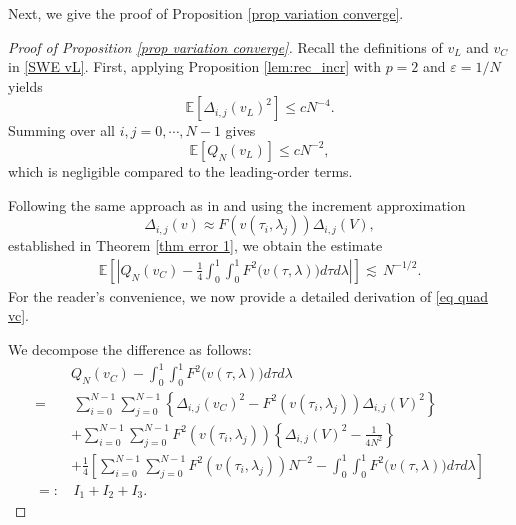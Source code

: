 \documentclass[11pt,reqno]{amsart}
\numberwithin{equation}{section}
\newcommand{\1}{{\bf 1}}
\newcommand{\2}{{\bf 2}}
\begin{document}
  Next, we give the proof of Proposition \ref{prop variation converge}.
 \begin{proof}[Proof of Proposition \ref{prop variation converge}]
 Recall the definitions of $v_L$ and $v_C$   in  \eqref{SWE vL}.
   First, applying Proposition \ref{lem:rec_incr} with $p=2$ and $\varepsilon = 1/N$ yields 
    $$\mathbb{E}\left[\Delta_{i,j}(v_L)^2\right] \le c  N^{-4}.$$
         Summing over all $i,j=0, \cdots, N-1$  gives
          $$\mathbb{E}[Q_N(v_L)] \le c  N^{-2},$$ 
    which is negligible compared to the leading-order terms.
    
Following  the same approach as  in \cite{LW25} and using the     increment approximation
 $$\Delta_{i,j}(v) \approx F(v(\tau_i, \lambda_j))\Delta_{i,j}(V),$$
  established  in Theorem \ref{thm error 1},   we  obtain the    estimate
   \begin{align}\label{eq quad vc}
  \mathbb E\left[\left| Q_{N}(v_C)- \frac14  \int_0^1\int_0^1 F^2\big(v(\tau, \lambda) \big) d\tau d\lambda \right|  \right]\lesssim\,  N^{- 1/2}.
  \end{align} 
 For the reader's convenience, we now provide a  detailed derivation of  \eqref{eq quad vc}. 
 
 
   We decompose the  difference  as follows:
\begin{equation}
\begin{split}
&Q_{N}(v_C)-     \int_0^1\int_0^1 F^2\big(v(\tau, \lambda) \big) d\tau d\lambda\\
 =&\,  \sum_{i=0}^{N-1}\sum_{j=0}^{N-1}\left\{\Delta_{i,j}(v_C)^2 - F^2(v(\tau_i, \lambda_j)) \Delta_{i,j}(V)^2 \right\}\\
 & +\sum_{i=0}^{N-1}\sum_{j=0}^{N-1} F^2(v(\tau_i, \lambda_j)) \left\{ \Delta_{i,j}(V)^2   -\frac{1}{4N^2} \right\}\\
  &+\frac14 \left[\sum_{i=0}^{N-1}\sum_{j=0}^{N-1}  F^2(v(\tau_i, \lambda_j))  N^{-2} -  \int_0^1\int_0^1 F^2\big(v(\tau, \lambda) \big) d\tau d\lambda\right]\\
  =:&\, I_1+I_2+I_3.
 \end{split}
 \end{equation}
 

\end{proof}
\end{document}
